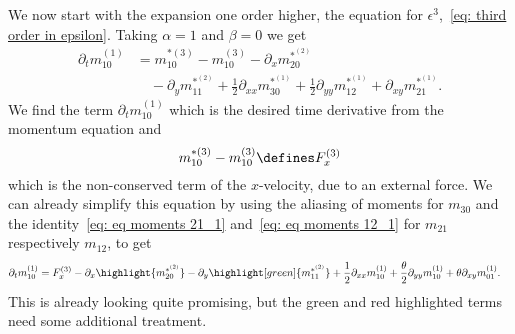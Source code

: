 We now start with the expansion one order higher, the equation for $\epsilon^3$,~\eqref{eq: third order in epsilon}.
Taking $\alpha=1$ and $\beta=0$ we get
\begin{equation}
  \begin{aligned}
     \partial_t m_{10}^{(1)} & =
    m_{10}^{*(3)} - m_{10}^{(3)} - \partial_x m_{20}^{*^{(2)}} \\
    &\quad - \partial_y m_{11}^{*^{(2)}} + \frac{1}{2}\partial_{xx} m_{30}^{*^{(1)}} + \frac{1}{2} \partial_{yy} m_{12}^{*^{(1)}} + \partial_{xy} m_{21}^{*^{(1)}}.
  \end{aligned}
\end{equation}
We find the term $\partial_t m_{10}^{(1)} $ which is the desired time derivative from the momentum equation and
\begin{equation}
  m_{10}^{*(3)} - m_{10}^{(3)}\defines F_x^{(3)}
\end{equation}
which is the non-conserved term of the $x$-velocity, due to an external force.
We can already simplify this equation by using the aliasing of moments for $m_{30}$ and the identity~\eqref{eq: eq moments 21_1} and~\eqref{eq: eq moments 12_1} for $m_{21}$ respectively $m_{12}$, to get
\begin{equation}
  \label{eq: start of momentum equation derivation}
  \begin{aligned}
    \partial_t m_{10}^{(1)} & =
    F_x^{(3)} - \partial_x \highlight{m_{20}^{*^{(2)}}} - \partial_y \highlight[green]{m_{11}^{*^{(2)}}} + \frac{1}{2}\partial_{xx} m_{10}^{(1)} + \frac{\theta}{2} \partial_{yy} m_{10}^{(1)} + \theta\partial_{xy} m_{01}^{(1)}.
  \end{aligned}
\end{equation}
This is already looking quite promising, but the green and red highlighted terms need some additional treatment.
